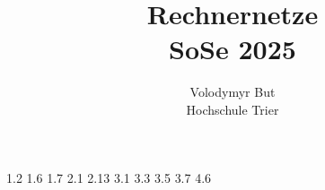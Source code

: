 \documentclass[10pt, oneside]{article}
\title{Rechnernetze\\[10pt]\Large{SoSe 2025}}
\author{Volodymyr But\\[10pt]Hochschule Trier}
\date{}
\begin{document}
\maketitle
\vspace{25px}

{1.2}
{1.6}
{1.7}
{2.1}
{2.13}
{3.1}
\pagebreak
{3.3}
{3.5}
\pagebreak
{3.7}
{4.6}
\end{document}
